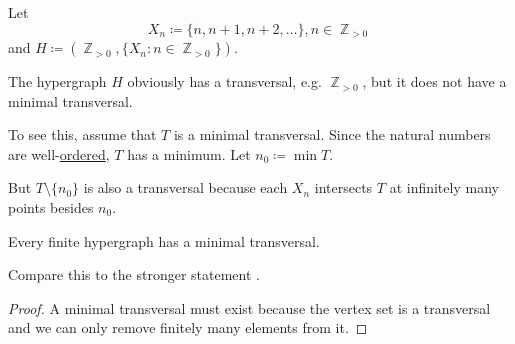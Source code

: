 \begin{example}\label{ex:no_minimal_set_transversal}
  Let
  \begin{equation*}
    X_n \coloneqq \{ n, n + 1, n + 2, \ldots \}, n \in \BbbZ_{>0}
  \end{equation*}
  and \( H \coloneqq (\BbbZ_{>0}, \{ X_n \colon n \in \BbbZ_{>0} \}) \).

  The hypergraph \( H \) obviously has a transversal, e.g. \( \BbbZ_{>0} \), but it does not have a minimal transversal.

  To see this, assume that \( T \) is a minimal transversal. Since the natural numbers are well-\hyperref[thm:natural_numbers_are_well_ordered]{ordered}, \( T \) has a minimum. Let \( n_0 \coloneqq \min T \).

  But \( T \setminus \{ n_0 \} \) is also a transversal because each \( X_n \) intersects \( T \) at infinitely many points besides \( n_0 \).
\end{example}

\begin{proposition}\label{thm:finite_hypergraphs_have_minimal_transversal}
  Every finite hypergraph has a minimal transversal.

  Compare this to the stronger statement .
\end{proposition}
\begin{proof}
  A minimal transversal must exist because the vertex set is a transversal and we can only remove finitely many elements from it.
\end{proof}

